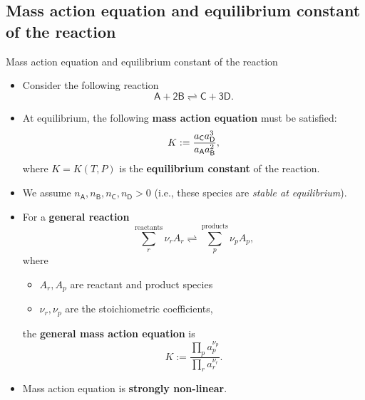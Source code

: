 \subsection{Mass action equation and equilibrium constant of the reaction}
%
\begin{frame}{Mass action equation and equilibrium constant of the reaction}

\lcol
\begin{itemize}
\item Consider the following reaction
\[
\mathsf{A+2B\rightleftharpoons C+3D}.
\]
\vskip -10pt
\pause
\item At equilibrium, the following \alert{\textbf{mass action equation}} must be
satisfied:
\[
K :=\frac{a_{\sf C}a_{\sf D}^{3}}{a_{\sf A}a_{\sf B}^{2}},
\]
where $K=K(T,P)$ is the \alert{\textbf{equilibrium constant}} of the reaction.
\pause
\item We assume $n_{\mathsf{A}},n_{\mathsf{B}},n_{\mathsf{C}},n_{\mathsf{D}}>0$
(i.e., these species are \emph{stable at equilibrium}).

\end{itemize}
\rcol
\pause
\begin{itemize}
\item For a \textbf{general reaction}
\[
\sum_{r}^{\text{reactants}}\nu_{r}A_{r}\rightleftharpoons\sum_{p}^{\text{products}}\nu_{p}A_{p},
\]
where 
\begin{itemize}
\item $A_{r}, A_p$ are reactant and product species
\item $\nu_{r}, \nu_{p}$ are the stoichiometric coefficients,
\end{itemize}
%
the \alert{\textbf{general mass action equation}} is
\[
\boxed{
K := \dfrac{\prod_{p}a_{p}^{\nu_{p}}}{\prod_{r}a_{r}^{\nu_{r}}}.
}
\]
\pause
\vskip -5pt
\item Mass action equation is \alert{\textbf{strongly non-linear}}.
\end{itemize}
\ecol
\end{frame}
%
